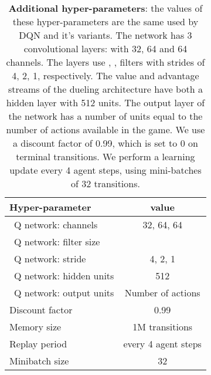 \documentclass[letterpaper]{article} \usepackage{aaai18}  \usepackage{times}  \usepackage{helvet}  \usepackage{courier}  \usepackage{url}  \usepackage{graphicx}  \usepackage{amsmath,amssymb}
\begin{document}
\vspace{3em}

\begin{table}[h!]
\centering
\begin{tabular}{ l | c }
\hline
Hyper-parameter           & value \\
\hline
 \ Q network: channels     &  32, 64, 64 \\
 \ Q network: filter size  &   \\
 \ Q network: stride       &  4, 2, 1 \\
 \ Q network: hidden units         &  512 \\
 \ Q network: output units         & Number of actions \\
  Discount factor               & 0.99 \\
  Memory size            & 1M transitions \\ 
  Replay period          & every 4 agent steps \\
  Minibatch size         & 32 \\
\hline

\end{tabular}
\caption{\textbf{Additional hyper-parameters}: the values of these hyper-parameters are the same used by DQN and it's variants. The network has 3 convolutional layers: with 32, 64 and 64 channels. The layers use , ,  filters with strides of 4, 2, 1, respectively. The value and advantage streams of the dueling architecture have both a hidden layer with 512 units. The output layer of the network has a number of units equal to the number of actions available in the game. We use a discount factor of 0.99, which is set to 0 on terminal transitions. We perform a learning update every 4 agent steps, using mini-batches of 32 transitions.
}
\label{tab:other_hyperparams}
\end{table}

\newpage
\end{document}
